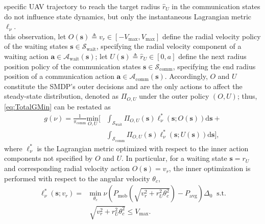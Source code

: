 \documentclass[10pt, twocolumn]{IEEEtran}
\theoremstyle{plain}
\theoremstyle{definition}
\theoremstyle{remark}
\begin{document}
specific UAV trajectory to reach the target radius $\hat{r}_{U}$ in the {communication} states do not influence state dynamics, but only the instantaneous Lagrangian metric $\ell_{\nu}$.\\
 this observation, let $O(\mathbf{s}){\triangleq}v_{r}{\in}[-V_{\mathrm{max}},V_{\mathrm{max}}]$ define the radial velocity policy of the {waiting} states $\mathbf{s}{\in}\mathcal{S}_{\mathrm{wait}}$, specifying the radial velocity component of a waiting action $\mathbf{a}{\in}\mathcal{A}_{\mathrm{wait}}(\mathbf{s})$; let $U(\mathbf{s}){\triangleq}\hat{r}_{U}{\in}[0,a]$ define the next radius position policy of the {communication} states $\mathbf{s}{\in}\mathcal{S}_{\mathrm{comm}}$, specifying the end radius position of a communication action $\mathbf{a}{\in}\mathcal{A}_{\mathrm{comm}}(\mathbf{s})$. Accordingly, $O$ and $U$ constitute the SMDP's outer decisions and are the only actions to affect the steady-state distribution, denoted as $\Pi_{O,U}$ under the outer policy $(O,U)$; thus, \eqref{eq:TotalGMin} can be restated as
\begin{align}\label{eq:PolDecomp}
	g(\nu) = \frac{1}{\pi_{\mathrm{comm}}} \underset{O,U}{\mathrm{min}} \Bigr[& \int_{\mathcal{S}_{\mathrm{wait}}} \Pi_{O,U}(\mathbf{s}) \ell_{\nu}^{*}(\mathbf{s}; O(\mathbf{s}))\mathrm{d}\mathbf{s} +\nonumber\\ &\int_{\mathcal{S}_{\mathrm{comm}}} \Pi_{O,U}(\mathbf{s}) \ell_{\nu}^{*}(\mathbf{s}; U(\mathbf{s})) \mathrm{d}\mathbf{s} \Bigr],
\end{align}
where $\ell_{\nu}^{*}$ is the Lagrangian metric optimized with respect to the {inner action} components not specified by $O$ and $U$. In particular, for a waiting state $\mathbf{s}{=}r_{U}$ and corresponding radial velocity action $O(\mathbf{s}){=}v_{r}$, the inner optimization is performed with respect to the angular velocity $\theta_{c}$,
\begin{align}\label{eq:MinLWP}
	\ell_{\nu}^{*}(\mathbf{s}; v_r) =& \underset{\theta_c}{\mathrm{min}}\; \nu \left( P_{\mathrm{mob}}\left(\sqrt{v_{r}^2 + r_U^2\theta_c^2}\right) - P_{\mathrm{avg}} \right)\Delta_0 \;\; \mathrm{s.t.}\nonumber\\&\sqrt{v_{r}^{2} + r_U^2\theta_c^2} \leq V_{\mathrm{max}}.
\end{align}
\end{document}
